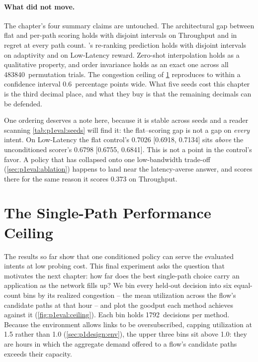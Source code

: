 \paragraph{What did not move.} The chapter's four summary claims are untouched. The architectural gap
between flat and per-path scoring holds with disjoint intervals on Throughput and in regret at every path
count. 's re-ranking prediction holds with disjoint intervals on adaptivity and on
Low-Latency reward. Zero-shot interpolation holds as a qualitative property, and order invariance holds
as an exact one across all 483840~permutation trials. The congestion ceiling of \cref{sec:p1eval:ceiling}
reproduces to within a confidence interval 0.6~percentage points wide. What five seeds cost this chapter
is the third decimal place, and what they buy is that the remaining decimals can be defended.

One ordering deserves a note here, because it is stable across seeds and a reader scanning
\cref{tab:p1eval:seeds} will find it: the flat--scoring gap is not a gap on \emph{every} intent. On
Low-Latency the flat control's 0.7026 [0.6918, 0.7134] sits \emph{above} the unconditioned scorer's
0.6798 [0.6755, 0.6841]. This is not a point in the control's favor. A policy that has collapsed onto one
low-bandwidth trade-off (\cref{sec:p1eval:ablation}) happens to land near the latency-averse answer, and
scores there for the same reason it scores 0.373 on Throughput.

\section{The Single-Path Performance Ceiling}
\label{sec:p1eval:ceiling}

The results so far show that one conditioned policy can serve the evaluated intents at low probing
cost. This final experiment asks the question that motivates the next chapter: how far does the best
single-path choice carry an application as the network fills up? We bin every held-out decision into six
equal-count bins by its realized congestion -- the mean utilization across the flow's candidate paths at
that hour -- and plot the goodput each method achieves against it (\cref{fig:p1eval:ceiling}). Each bin
holds 1792~decisions per method. Because the environment allows links to be oversubscribed, capping
utilization at 1.5 rather than 1.0 (\cref{sec:p1design:env}), the upper three bins sit above 1.0: they are
hours in which the aggregate demand offered to a flow's candidate paths exceeds their capacity.

